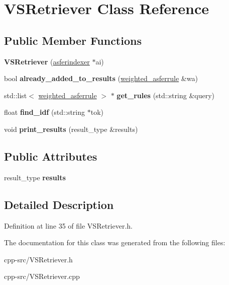 \hypertarget{classVSRetriever}{\section{V\-S\-Retriever Class Reference}
\label{classVSRetriever}
}
\subsection*{Public Member Functions}
\begin{DoxyCompactItemize}
\item 
\hypertarget{classVSRetriever_aff83707571a9f46b257cc5bee9c9bdcc}{{\bfseries V\-S\-Retriever} (\hyperlink{classasferindexer}{asferindexer} $\ast$ai)}\label{classVSRetriever_aff83707571a9f46b257cc5bee9c9bdcc}

\item 
\hypertarget{classVSRetriever_a12cf2143833371dcaadf75c8f6c9ec79}{bool {\bfseries already\-\_\-added\-\_\-to\-\_\-results} (\hyperlink{structweighted__asferrule}{weighted\-\_\-asferrule} \&wa)}\label{classVSRetriever_a12cf2143833371dcaadf75c8f6c9ec79}

\item 
\hypertarget{classVSRetriever_a354e36148d933f93dd03505b95e2466e}{std\-::list$<$ \hyperlink{structweighted__asferrule}{weighted\-\_\-asferrule} $>$ $\ast$ {\bfseries get\-\_\-rules} (std\-::string \&query)}\label{classVSRetriever_a354e36148d933f93dd03505b95e2466e}

\item 
\hypertarget{classVSRetriever_af57496c63d63032a84146d1945611ffe}{float {\bfseries find\-\_\-idf} (std\-::string $\ast$tok)}\label{classVSRetriever_af57496c63d63032a84146d1945611ffe}

\item 
\hypertarget{classVSRetriever_a12d528f844e3d795359d6c40d248eb93}{void {\bfseries print\-\_\-results} (result\-\_\-type \&results)}\label{classVSRetriever_a12d528f844e3d795359d6c40d248eb93}

\end{DoxyCompactItemize}
\subsection*{Public Attributes}
\begin{DoxyCompactItemize}
\item 
\hypertarget{classVSRetriever_aed689736ee1ec47f9ed2cd2660525925}{result\-\_\-type {\bfseries results}}\label{classVSRetriever_aed689736ee1ec47f9ed2cd2660525925}

\end{DoxyCompactItemize}


\subsection{Detailed Description}


Definition at line 35 of file V\-S\-Retriever.\-h.



The documentation for this class was generated from the following files\-:\begin{DoxyCompactItemize}
\item 
cpp-\/src/V\-S\-Retriever.\-h\item 
cpp-\/src/V\-S\-Retriever.\-cpp\end{DoxyCompactItemize}

